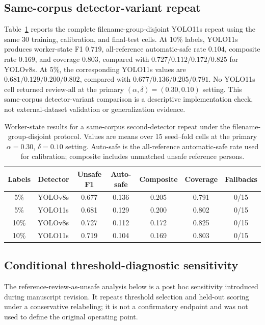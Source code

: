 \documentclass[iicol,pdflatex,sn-mathphys-num]{sn-jnl}
\begin{document}
\subsection{Same-corpus detector-variant repeat}

Table~\ref{tab:detector_robustness} reports the complete filename-group-disjoint YOLO11s repeat using the same 30 training, calibration, and final-test cells. At 10\% labels, YOLO11s produces worker-state F1 $0.719$, all-reference automatic-safe rate $0.104$, composite rate $0.169$, and coverage $0.803$, compared with $0.727/0.112/0.172/0.825$ for YOLOv8s. At 5\%, the corresponding YOLO11s values are $0.681/0.129/0.200/0.802$, compared with $0.677/0.136/0.205/0.791$. No YOLO11s cell returned review-all at the primary $(\alpha,\delta)=(0.30,0.10)$ setting. This same-corpus detector-variant comparison is a descriptive implementation check, not external-dataset validation or generalization evidence.

\begin{table}[t]
\caption{Worker-state results for a same-corpus second-detector repeat under the filename-group-disjoint protocol. Values are means over 15 seed--fold cells at the primary $\alpha=0.30$, $\delta=0.10$ setting. Auto-safe is the all-reference automatic-safe rate used for calibration; composite includes unmatched unsafe reference persons.}
\label{tab:detector_robustness}
\centering
\scriptsize
\setlength{\tabcolsep}{5pt}
\begin{tabular}{@{}c l c c c c c@{}}
\toprule
Labels & Detector & Unsafe F1 & Auto-safe & Composite & Coverage & Fallbacks \\
\midrule
5\%  & YOLOv8s  & 0.677 & 0.136 & 0.205 & 0.791 & 0/15 \\
5\%  & YOLO11s  & 0.681 & 0.129 & 0.200 & 0.802 & 0/15 \\
10\% & YOLOv8s  & 0.727 & 0.112 & 0.172 & 0.825 & 0/15 \\
10\% & YOLO11s  & 0.719 & 0.104 & 0.169 & 0.803 & 0/15 \\
\bottomrule
\end{tabular}
\end{table}


\subsection{Conditional threshold-diagnostic sensitivity}

The reference-review-as-unsafe analysis below is a post hoc sensitivity introduced during manuscript revision. It repeats threshold selection and held-out scoring under a conservative relabeling; it is not a confirmatory endpoint and was not used to define the original operating point.
\end{document}
